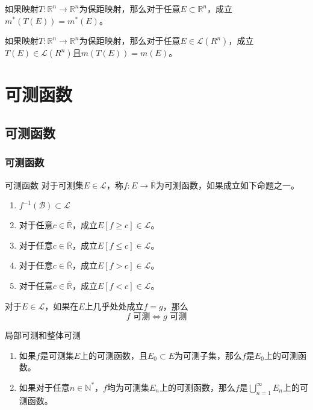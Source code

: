 \documentclass[lang = cn, scheme = chinese, thmcnt = section]{elegantbook}
\newcommand{\N}{\mathbb{N}}            %
\newcommand{\R}{\mathbb{R}}            %
\newcommand{\sub}{\subset}             %
\newcommand{\dis}{\displaystyle}
\begin{document}
\begin{theorem}
	如果映射$T:\R^n\to\R^n$为保距映射，那么对于任意$E\sub\R^n$，成立$m^*(T(E))=m^*(E)$。
\end{theorem}

\begin{theorem}
	如果映射$T:\R^n\to\R^n$为保距映射，那么对于任意$E\in\mathscr{L}(R^n)$，成立$T(E)\in\mathscr{L}(R^n)$且$m(T(E))=m(E)$。
\end{theorem}

\chapter{可测函数}

\section{可测函数}

\subsection{可测函数}

\begin{definition}{可测函数}
	对于可测集$E\in\mathscr{L}$，称$f:E\to\overline{\R}$为可测函数，如果成立如下命题之一。
	\begin{enumerate}
		\item $f^{-1}(\mathscr{B})\sub \mathscr{L}$
		\item 对于任意$c\in\overline{\R}$，成立$E[f\ge c]\in\mathscr{L}$。
		\item 对于任意$c\in\overline{\R}$，成立$E[f\le c]\in\mathscr{L}$。
		\item 对于任意$c\in\overline{\R}$，成立$E[f> c]\in\mathscr{L}$。
		\item 对于任意$c\in\overline{\R}$，成立$E[f< c]\in\mathscr{L}$。
	\end{enumerate}
\end{definition}

\begin{theorem}
	对于$E\in\mathscr{L}$，如果在$E$上几乎处处成立$f=g$，那么%
	$$
	f\text{ 可测}
	\iff
	g\text{ 可测}
	$$
\end{theorem}

\begin{theorem}{局部可测和整体可测}
	\begin{enumerate}
		\item 如果$f$是可测集$E$上的可测函数，且$E_0\sub E$为可测子集，那么$f$是$E_0$上的可测函数。
		\item 如果对于任意$n\in\N^*$，$f$均为可测集$E_n$上的可测函数，那么$f$是$\dis\bigcup_{n=1}^{\infty}{E_n}$上的可测函数。
	\end{enumerate}
\end{theorem}
\end{document}
